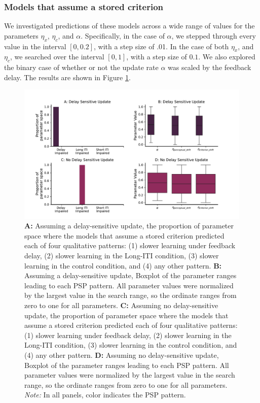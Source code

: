 \documentclass[doc, floatsintext]{apa7}
\begin{document}
\subsubsection{Models that assume a stored criterion}
We investigated predictions of these models across a wide
range of values for the parameters $\eta_{x}$, $\eta_{c}$,
and $\alpha$.  Specifically, in the case of $\alpha$,  we
stepped through every value in the interval $[0, 0.2]$, with
a step size of .01.  In the case of both $\eta_{x}$, and
$\eta_{c}$, we searched over the interval $[0, 1]$, with a
step size of $0.1$.  We also explored the binary case of
whether or not the update rate $\alpha$ was scaled by the
feedback delay. The results are shown in Figure
\ref{fig:model_class_II_results}. 

\begin{figure} 
  \centering
  \includegraphics[width=1\textwidth]{../figures/model_new_class_II.pdf}
  \caption{ 
      \textbf{A:} Assuming a delay-sensitive update, the
      proportion of parameter space where the models that
      assume a stored criterion predicted each of four
      qualitative patterns: (1) slower learning under
      feedback delay, (2) slower learning in the Long-ITI
      condition, (3) slower learning in the control
      condition, and (4) any other pattern. 
      \textbf{B:} Assuming a delay-sensitive update, Boxplot
      of the parameter ranges leading to each PSP pattern.
      All parameter values were normalized by the largest
      value in the search range, so the ordinate ranges from
      zero to one for all parameters.
      \textbf{C:} Assuming no delay-sensitive update, the
      proportion of parameter space where the models that
      assume a stored criterion predicted each of four
      qualitative patterns: (1) slower learning under
      feedback delay, (2) slower learning in the Long-ITI
      condition, (3) slower learning in the control
      condition, and (4) any other pattern. 
      \textbf{D:} Assuming no delay-sensitive update, Boxplot
      of the parameter ranges leading to each PSP pattern.
      All parameter values were normalized by the largest
      value in the search range, so the ordinate ranges from
      zero to one for all parameters.
      \textit{Note:} In all panels, color indicates the PSP
      pattern.
}
  \label{fig:model_class_II_results}
\end{figure}
\end{document}
